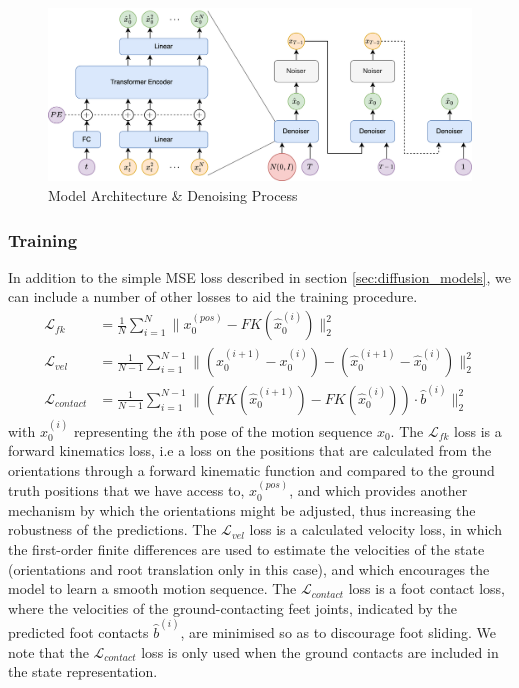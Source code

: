 \begin{figure}[!ht]
    \centering
    \includegraphics[width=1\textwidth]{Figures/diffusion/Network_diagram.png}
    \caption{Model Architecture \& Denoising Process}
    \label{fig:dmd_architecture}
\end{figure}



\subsubsection{Training}
\label{sec:diffusion_training}

In addition to the simple MSE loss described in section \ref{sec:diffusion_models}, we can include a number of other losses to aid the training procedure.
\begin{equation}
    \begin{aligned}
        \mathcal{L}_{fk} &= \frac{1}{N} \sum_{i=1}^{N} \| x_0^{(pos)} - FK(\hat{x}_0^{(i)})  \|_2^2 \\
        \mathcal{L}_{vel} &= \frac{1}{N-1} \sum_{i=1}^{N-1} \| (x_0^{(i+1)} - x_0^{(i)}) - (\hat{x}_0^{(i+1)} - \hat{x}_0^{(i)}) \|_2^2 \\
        \mathcal{L}_{contact} &= \frac{1}{N-1} \sum_{i=1}^{N-1} \| \left( FK(\hat{x}_0^{(i+1)}) - FK(\hat{x}_0^{(i)}) \right) \cdot \hat{b}^{(i)}  \|_2^2
    \end{aligned}
\end{equation}
with $x_0^{(i)}$ representing the $i$th pose of the motion sequence $x_0$. The $\mathcal{L}_{fk}$ loss is a forward kinematics loss, i.e a loss on the positions that are calculated from the orientations through a forward kinematic function and compared to the ground truth positions that we have access to, $x_0^{(pos)}$, and which provides another mechanism by which the orientations might be adjusted, thus increasing the robustness of the predictions. The $\mathcal{L}_{vel}$ loss is a calculated velocity loss, in which the first-order finite differences are used to estimate the velocities of the state (orientations and root translation only in this case), and which encourages the model to learn a smooth motion sequence. The $\mathcal{L}_{contact}$ loss is a foot contact loss, where the velocities of the ground-contacting feet joints, indicated by the predicted foot contacts $\hat{b}^{(i)}$, are minimised so as to discourage foot sliding. We note that the $\mathcal{L}_{contact}$ loss is only used when the ground contacts are included in the state representation.



